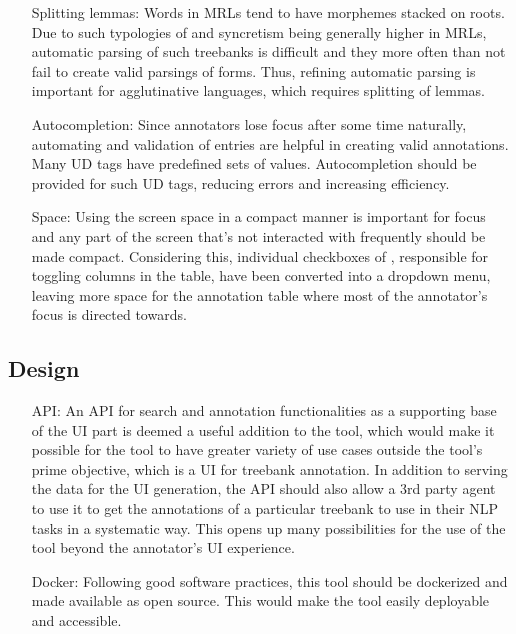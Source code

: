 \begin{itemize}[before=\normalfont, font=\itshape, align=left]
    \item[Splitting lemmas:]
        Words in MRLs tend to have morphemes stacked on roots.
        Due to such typologies of and syncretism being generally higher in MRLs, automatic parsing of such treebanks is difficult and they more often than not fail to create valid parsings of forms.
        Thus, refining automatic parsing is important for agglutinative languages, which requires splitting of lemmas.

    \item[Autocompletion:]
        Since annotators lose focus after some time naturally, automating and validation of entries are helpful in creating valid annotations.
        Many UD tags have predefined sets of values.
        Autocompletion should be provided for such UD tags, reducing errors and increasing efficiency.

    \item[Space:]
        Using the screen space in a compact manner is important for focus and any part of the screen that's not interacted with frequently should be made compact.
        Considering this, individual checkboxes of \boatvone, responsible for toggling columns in the table, have been converted into a dropdown menu, leaving more space for the annotation table where most of the annotator's focus is directed towards.
\end{itemize}

\subsection{Design}
\begin{itemize}[before=\normalfont, font=\itshape, align=left]
    \item[API:]
        An API for search and annotation functionalities as a supporting base of the UI part is deemed a useful addition to the tool, which would make it possible for the tool to have greater variety of use cases outside the tool's prime objective, which is a UI for treebank annotation.
        In addition to serving the data for the UI generation, the API should also allow a 3rd party agent to use it to get the annotations of a particular treebank to use in their NLP tasks in a systematic way.
        This opens up many possibilities for the use of the tool beyond the annotator's UI experience.

    \item[Docker:]
        Following good software practices, this tool should be dockerized and made available as open source.
        This would make the tool easily deployable and accessible.
\end{itemize}
